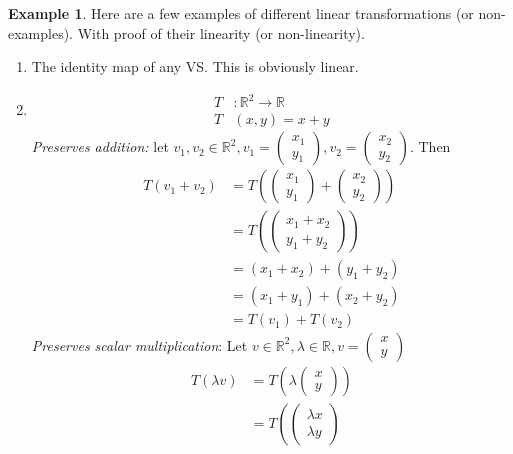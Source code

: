 \documentclass{report}
\theoremstyle{remark}
\theoremstyle{definition}
\theoremstyle{definition}
\newtheorem{example}[theorem]{Example}
\theoremstyle{theorem}
\begin{document}
\begin{example}
Here are a few examples of different linear transformations (or non-examples). With proof of their linearity (or non-linearity).
\begin{enumerate}
    \item The identity map of any VS. This is obviously linear.
    \item \begin{align*}
        T&: \mathbb{R}^2 \rightarrow \mathbb{R}\\
        T&(x, y) = x + y
    \end{align*}
    \emph{Preserves addition:} let $v_1, v_2 \in \mathbb{R}^2, v_1 = \begin{pmatrix}x_1\\y_1\end{pmatrix}, v_2 = \begin{pmatrix}x_2\\y_2\end{pmatrix}$. Then
    \begin{align*}
        T(v_1 + v_2) &= T\left(\begin{pmatrix}x_1\\y_1\end{pmatrix} + \begin{pmatrix}x_2\\y_2\end{pmatrix}\right)\\
        &= T\left(\begin{pmatrix}x_1 + x_2\\ y_1 + y_2\end{pmatrix}\right)\\
        &= (x_1 + x_2) + (y_1 + y_2)\\
        &= (x_1 + y_1) + (x_2 + y_2)\\
        &= T(v_1) + T(v_2)
    \end{align*}
    \emph{Preserves scalar multiplication}: Let $v \in \mathbb{R}^2, \lambda \in \mathbb{R}, v = \begin{pmatrix}
    x\\y
    \end{pmatrix}$
    \begin{align*}
        T(\lambda v) &= T\left(\lambda\begin{pmatrix}x\\y\end{pmatrix}\right)\\
        &=T\left(\begin{pmatrix}
        \lambda x\\ \lambda y

\end{pmatrix}
\end{align*}
\end{enumerate}
\end{example}
\end{document}

